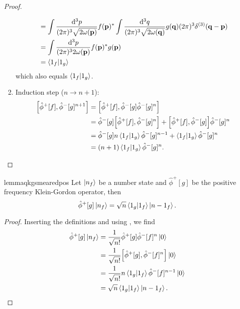 \begin{proof}
\begin{enumerate}
\begin{equation*}
\begin{split}
				&=
				\int\frac{\dd[3]{p}}{(2\pi)^3\sqrt{2\omega(\vb{p})}}
				f(\vb{p})^*
				\int\frac{\dd[3]{q}}{(2\pi)^3\sqrt{2\omega(\vb{q})}}
				g(\vb{q})
				(2\pi)^3\delta^{(3)}(\vb{q}-\vb{p})
				\\
				&=
				\int\frac{\dd[3]{p}}{(2\pi)^32\omega(\vb{p})}
				f(\vb{p})^*
				g(\vb{p})
				\\
				&=
				\braket{1_f}{1_g}
			\end{split}
		\end{equation*}
		which also equals $\braket{1_f}{1_g}$.
		\item Induction step ($n\to n+1$):
		\begin{equation*}
			\begin{split}
				\comm{\hat\phi^+[f]}{\hat\phi^-[g]^{n+1}}
				&=
				\comm{\hat\phi^+[f]}{\hat\phi^-[g]\hat\phi^-[g]^n}
				\\
				&=
				\hat\phi^-[g]
				\comm{\hat\phi^+[f]}{\hat\phi^-[g]^n}
				+
				\comm{\hat\phi^+[f]}{\hat\phi^-[g]}
				\hat\phi^-[g]^n
				\\
				&=
				\hat\phi^-[g]
				n\braket{1_f}{1_g}
				\hat\phi^-[g]^{n-1}
				+
				\braket{1_f}{1_g}
				\hat\phi^-[g]^n
				\\
				&=
				(n+1)
				\braket{1_f}{1_g}
				\hat\phi^-[g]^n
				.
			\end{split}
		\end{equation*}
	\end{enumerate}
\end{proof}
\begin{restatable}{lemma}{qkgsmearedpos}\label{thm:qkg_smeared_pos}
	Let $\ket{n_f}$ be a number state and $\hat\phi^+[g]$ be the positive frequency Klein-Gordon operator, then
	\begin{equation}
		\hat\phi^+[g]
		\ket{n_f}
		=
		\sqrt{n}
		\braket{1_g}{1_f}
		\ket{n-1_f}
		.
	\end{equation}
\end{restatable}
\begin{proof}
	Inserting the definitions and using , we find
	\begin{equation*}
		\begin{split}
			\hat\phi^+[g]
			\ket{n_f}
			&=
			\frac{1}{\sqrt{n!}}
			\hat\phi^+[g]
			\hat\phi^-[f]^n
			\ket{0}
			\\
			&=
			\frac{1}{\sqrt{n!}}
			\comm{\hat\phi^+[g]}{\hat\phi^-[f]^n}
			\ket{0}
			\\
			&=
			\frac{1}{\sqrt{n!}}
			n
			\braket{1_g}{1_f}
			\hat\phi^-[f]^{n-1}
			\ket{0}
			\\
			&=
			\sqrt{n}
			\braket{1_g}{1_f}
			\ket{n-1_f}
			.
		\end{split}
	\end{equation*}
\end{proof}
